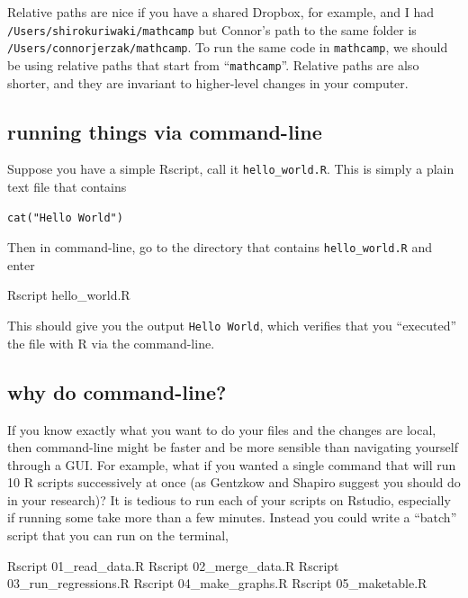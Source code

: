 \documentclass[]{book}
\newenvironment{Shaded}{\begin{snugshade}}{\end{snugshade}}
\newcommand{\ExtensionTok}[1]{#1}
\newcommand{\NormalTok}[1]{#1}
\theoremstyle{definition}
\theoremstyle{definition}
\theoremstyle{definition}
\theoremstyle{remark}
\begin{document}
\begin{Shaded}
\begin{Highlighting}[]
\begin{Shaded}
\begin{Highlighting}[]
\begin{Shaded}
\begin{Highlighting}[]
Relative paths are nice if you have a shared Dropbox, for example, and I had \texttt{/Users/shirokuriwaki/mathcamp} but Connor's path to the same folder is \texttt{/Users/connorjerzak/mathcamp}. To run the same code in \texttt{mathcamp}, we should be using relative paths that start from ``\texttt{mathcamp}''. Relative paths are also shorter, and they are invariant to higher-level changes in your computer.

\hypertarget{running-things-via-command-line}{%
\subsection{running things via command-line}\label{running-things-via-command-line}}

Suppose you have a simple Rscript, call it \texttt{hello\_world.R}. This is simply a plain text file that contains

\begin{verbatim}
cat("Hello World")
\end{verbatim}

Then in command-line, go to the directory that contains \texttt{hello\_world.R} and enter

\begin{Shaded}
\begin{Highlighting}[]
\ExtensionTok{Rscript}\NormalTok{ hello_world.R}
\end{Highlighting}
\end{Shaded}

This should give you the output \texttt{Hello\ World}, which verifies that you ``executed'' the file with R via the command-line.

\hypertarget{why-do-command-line}{%
\subsection{why do command-line?}\label{why-do-command-line}}

If you know exactly what you want to do your files and the changes are local, then command-line might be faster and be more sensible than navigating yourself through a GUI. For example, what if you wanted a single command that will run 10 R scripts successively at once (as Gentzkow and Shapiro suggest you should do in your research)? It is tedious to run each of your scripts on Rstudio, especially if running some take more than a few minutes. Instead you could write a ``batch'' script that you can run on the terminal,

\begin{Shaded}
\begin{Highlighting}[]
\ExtensionTok{Rscript}\NormalTok{ 01_read_data.R}
\ExtensionTok{Rscript}\NormalTok{ 02_merge_data.R}
\ExtensionTok{Rscript}\NormalTok{ 03_run_regressions.R}
\ExtensionTok{Rscript}\NormalTok{ 04_make_graphs.R}
\ExtensionTok{Rscript}\NormalTok{ 05_maketable.R}
\end{Highlighting}
\end{Shaded}


\end{Highlighting}
\end{Shaded}
\end{Highlighting}
\end{Shaded}
\end{Highlighting}
\end{Shaded}
\end{document}
